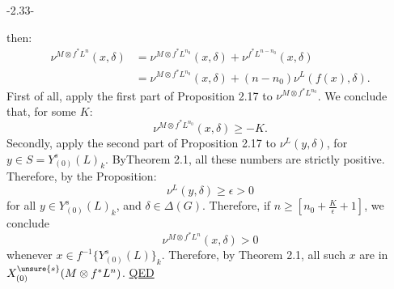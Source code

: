 \begin{center}-2.33-\end{center}
then:
\[
\begin{aligned}
\nu^{M\otimes f^*L^n}(x,\delta)&=\nu^{M\otimes f^*L^{n_0}}(x,\delta)+\nu^{f^*L^{n-n_0}}(x,\delta)\\
&=\nu^{M\otimes f^*L^{n_0}}(x,\delta)+(n-n_0)\nu^L(f(x),\delta).
\end{aligned}
\]
First of all, apply the first part of Proposition 2.17 to $\nu^{M\otimes f^*L^{n_0}}$.
We conclude that, for some $K$:
\[
\nu^{M\otimes f^*L^{n_0}}(x,\delta)\geq-K.
\]
Secondly, apply the second part of Proposition 2.17 to $\nu^L(y,\delta)$,
for $y\in S=Y^s_{(0)}(L)_k$. By\unsure{,,}Theorem 2.1, all these numbers are
strictly positive. Therefore, by the Proposition:
\[
\nu^L(y,\delta)\geq\epsilon>0
\]
for all $y\in Y^s_{(0)}(L)_k$, and $\delta\in\Delta(G)$. Therefore, if $n\geq\left[n_0+\frac K\epsilon+1\right]$,
we conclude
\[
\nu^{M\otimes f^*L^n}(x,\delta)>0
\]
whenever $x\in f^{-1}\{Y^s_{(0)}(L)\}_k$. Therefore, by Theorem 2.1, all such
$x$ are in $X^{\unsure{s}}_{(0)}(M\otimes f^*L^n)$. \uline{QED}
